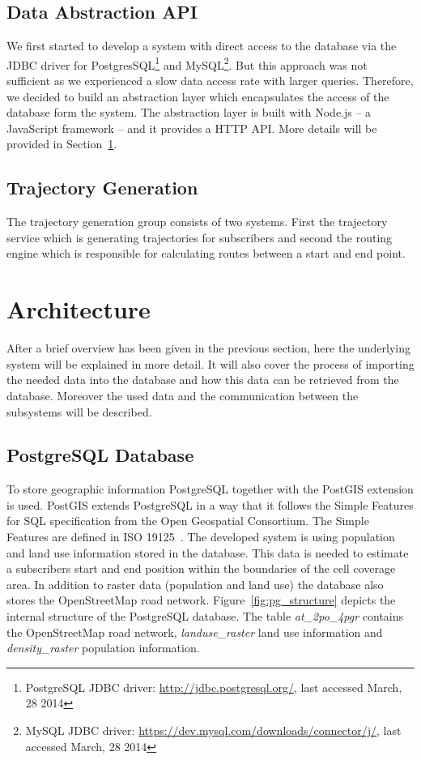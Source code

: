 \documentclass[master,english]{hgbthesis}
\begin{document}
\subsection{Data Abstraction API}

We first started to develop a system with direct access to the database via the JDBC driver for PostgresSQL\footnote{PostgreSQL JDBC driver: \url{http://jdbc.postgresql.org/}, last accessed March, 28 2014} and MySQL\footnote{MySQL JDBC driver: \url{https://dev.mysql.com/downloads/connector/j/}, last accessed March, 28 2014}. But this approach was not sufficient as we experienced a slow data access rate with larger queries. Therefore, we decided to build an abstraction layer which encapsulates the access of the database form the system. The abstraction layer is built with Node.js -- a JavaScript framework -- and it provides a HTTP API. More details will be provided in Section~\ref{sec:architecture}.

\subsection{Trajectory Generation}

The trajectory generation group consists of two systems. First the trajectory service which is generating trajectories for subscribers and second the routing engine which is responsible for calculating routes between a start and end point. 

\section{Architecture}

\label{sec:architecture}

After a brief overview has been given in the previous section, here the underlying system will be explained in more detail. It will also cover the process of importing the needed data into the database and how this data can be retrieved from the database. Moreover the used data and the communication between the subsystems will be described.

\subsection{PostgreSQL Database}

To store geographic information PostgreSQL together with the PostGIS extension is used. PostGIS extends PostgreSQL in a way that it follows the Simple Features for SQL specification from the Open Geospatial Consortium. The Simple Features are defined in ISO 19125~\cite{ISO19125,ISO191252}. The developed system is using population and land use information stored in the database. This data is needed to estimate a subscribers start and end position within the boundaries of the cell coverage area. In addition to raster data (population and land use) the database also stores the OpenStreetMap road network. Figure~\ref{fig:pg_structure} depicts the internal structure of the PostgreSQL database. The table \emph{at_2po_4pgr} contains the OpenStreetMap road network, \emph{landuse_raster} land use information and \emph{density_raster} population information. 
\end{document}
